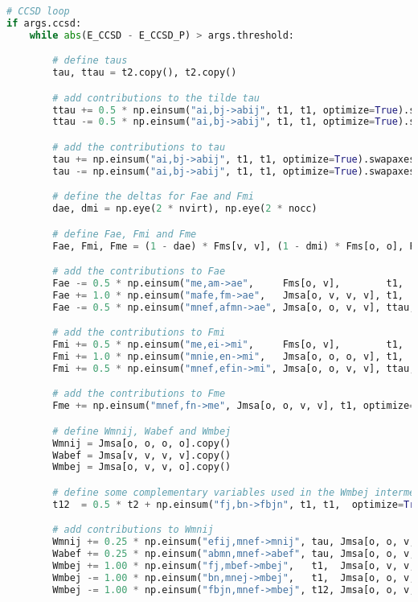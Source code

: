 \begin{lstlisting}[language=Python, caption={\acrshort{ccd} and \acrshort{ccsd} method exercise code solution.}, label=code:cc_solution]
# CCSD loop
if args.ccsd:
    while abs(E_CCSD - E_CCSD_P) > args.threshold:

        # define taus
        tau, ttau = t2.copy(), t2.copy()

        # add contributions to the tilde tau
        ttau += 0.5 * np.einsum("ai,bj->abij", t1, t1, optimize=True).swapaxes(0, 0)
        ttau -= 0.5 * np.einsum("ai,bj->abij", t1, t1, optimize=True).swapaxes(2, 3)

        # add the contributions to tau
        tau += np.einsum("ai,bj->abij", t1, t1, optimize=True).swapaxes(0, 0)
        tau -= np.einsum("ai,bj->abij", t1, t1, optimize=True).swapaxes(2, 3)

        # define the deltas for Fae and Fmi
        dae, dmi = np.eye(2 * nvirt), np.eye(2 * nocc)

        # define Fae, Fmi and Fme
        Fae, Fmi, Fme = (1 - dae) * Fms[v, v], (1 - dmi) * Fms[o, o], Fms[o, v].copy()

        # add the contributions to Fae
        Fae -= 0.5 * np.einsum("me,am->ae",     Fms[o, v],        t1,   optimize=True)
        Fae += 1.0 * np.einsum("mafe,fm->ae",   Jmsa[o, v, v, v], t1,   optimize=True)
        Fae -= 0.5 * np.einsum("mnef,afmn->ae", Jmsa[o, o, v, v], ttau, optimize=True)

        # add the contributions to Fmi
        Fmi += 0.5 * np.einsum("me,ei->mi",     Fms[o, v],        t1,   optimize=True)
        Fmi += 1.0 * np.einsum("mnie,en->mi",   Jmsa[o, o, o, v], t1,   optimize=True)
        Fmi += 0.5 * np.einsum("mnef,efin->mi", Jmsa[o, o, v, v], ttau, optimize=True)

        # add the contributions to Fme
        Fme += np.einsum("mnef,fn->me", Jmsa[o, o, v, v], t1, optimize=True)

        # define Wmnij, Wabef and Wmbej
        Wmnij = Jmsa[o, o, o, o].copy()
        Wabef = Jmsa[v, v, v, v].copy()
        Wmbej = Jmsa[o, v, v, o].copy()

        # define some complementary variables used in the Wmbej intermediate
        t12  = 0.5 * t2 + np.einsum("fj,bn->fbjn", t1, t1,  optimize=True)

        # add contributions to Wmnij
        Wmnij += 0.25 * np.einsum("efij,mnef->mnij", tau, Jmsa[o, o, v, v], optimize=True)
        Wabef += 0.25 * np.einsum("abmn,mnef->abef", tau, Jmsa[o, o, v, v], optimize=True)
        Wmbej += 1.00 * np.einsum("fj,mbef->mbej",   t1,  Jmsa[o, v, v, v], optimize=True) 
        Wmbej -= 1.00 * np.einsum("bn,mnej->mbej",   t1,  Jmsa[o, o, v, o], optimize=True) 
        Wmbej -= 1.00 * np.einsum("fbjn,mnef->mbej", t12, Jmsa[o, o, v, v], optimize=True) 


\end{lstlisting}
